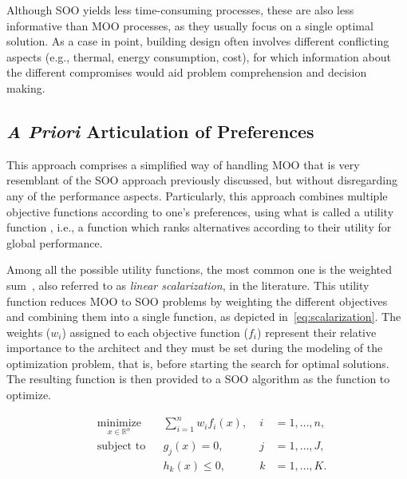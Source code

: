 	Although \ac{SOO} yields less time-consuming processes, these are also less informative than \ac{MOO} processes, as they usually focus on a single optimal solution. As a case in point, building design often involves different conflicting aspects (e.g., thermal, energy consumption, cost), for which information about the different compromises would aid problem comprehension and decision making.
	
	\subsection{\textit{A Priori} Articulation of Preferences}
	\label{ssec:preferencesarticulation}
	
	This approach comprises a simplified way of handling \ac{MOO} that is very resemblant of the \ac{SOO} approach previously discussed, but without disregarding any of the performance aspects. Particularly, this approach combines multiple objective functions according to one’s preferences, using what is called a utility function \cite{Marler2004}, i.e., a function which ranks alternatives according to their utility for global performance. 
	
	Among all the possible utility functions, the most common one is the weighted sum~\cite{Wortmann2017Opossum}, also referred to as \textit{linear scalarization}, in the literature. This utility function reduces \ac{MOO} to \ac{SOO} problems by weighting the different objectives and combining them into a single function, as depicted in~\cref{eq:scalarization}. The weights ($w_i$) assigned to each objective function ($f_i$) represent their relative importance to the architect and they must be set during the modeling of the optimization problem, that is, before starting the search for optimal solutions. The resulting function is then provided to a \ac{SOO} algorithm as the function to optimize. 
	
	\begin{equation} \label{eq:scalarization}
	\begin{aligned}
	& \underset{x \in \mathbb{R}^n}{\text{minimize}}
	& & \sum_{i=1}^n w_i f_i(x), & \; i &= 1, \ldots, n, \\
	& \text{subject to}
	& & g_j(x) = 0, & \; j &= 1, \ldots, J, \\ 
	&&& h_k(x) \leq 0, & \; k &= 1, \ldots, K.
	\end{aligned}
	\end{equation}
	
